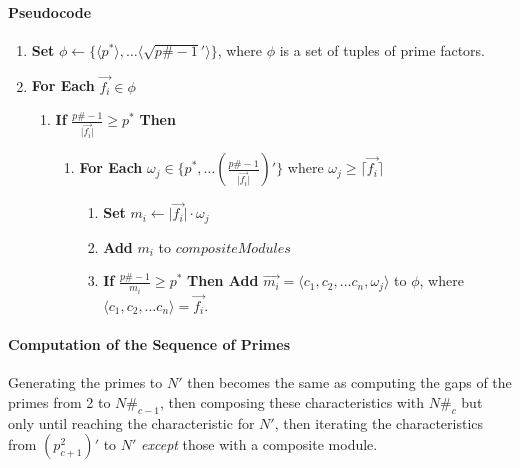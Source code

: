 \documentclass{article}
\begin{document}
\paragraph{Pseudocode}
\begin{enumerate}
\item \textbf{Set} $\phi \leftarrow \{ \langle p^* \rangle, \ldots \langle \sqrt{p\#-1}' \rangle \}$, where $\phi$ is a set of tuples of prime factors.
\item \textbf{For Each} $\vec{f_i} \in \phi$
	\begin{enumerate}
	\item \textbf{If} $\frac{p\#-1}{\lvert \vec{f_i} \rvert} \geq p^*$ \textbf{Then}
		\begin{enumerate}
		\item \textbf{For Each} $\omega_j \in \{p^*, \ldots (\frac{p\#-1}{\lvert \vec{f_i} \rvert})'\}$ where $\omega_j \geq \lceil \vec{f_i} \rceil$
			\begin{enumerate}	
				\item \textbf{Set} $m_i \leftarrow \lvert \vec{f_i} \rvert \cdot \omega_j$
				\item \textbf{Add} $m_i$ to $compositeModules$
				\item \textbf{If} $\frac{p\#-1}{m_i} \geq p^*$ \textbf{Then Add} $\vec{ m_i} = \langle c_1, c_2, \ldots c_n, \omega_j \rangle$ to $\phi$, where $\langle c_1, c_2, \ldots c_n\rangle = \vec{f_i}$. 
			\end{enumerate}
		\end{enumerate}
	\end{enumerate}
\end{enumerate}

\paragraph{Computation of the Sequence of Primes}		Generating the primes to $N'$ then becomes the same as computing the gaps of the primes from 2 to $N\#_{c-1}$, then composing these characteristics with $N\#_c$ but only until reaching the characteristic for $N'$, then iterating the characteristics from $(p_{c+1}^2)'$ to $N'$ \emph{except} those with a composite module.
\end{document}
